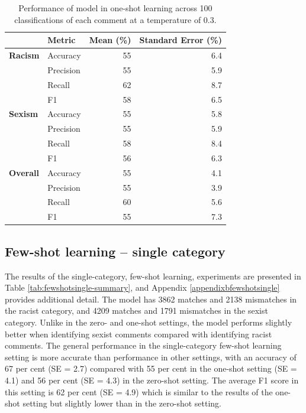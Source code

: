 \documentclass[12pt,]{article}
\begin{document}
\begin{table}

\caption{\label{tab:oneshot-summary}Performance of model in one-shot learning across 100 classifications of each comment at a temperature of 0.3.}
\centering
\begin{tabular}[t]{>{}llrr}
\toprule
 & Metric & Mean (\%) & Standard Error (\%)\\
\midrule
\textbf{Racism} & Accuracy & 55 & 6.4\\
\textbf{} & Precision & 55 & \vphantom{1} 5.9\\
\textbf{} & Recall & 62 & 8.7\\
\textbf{} & F1 & 58 & 6.5\\
\textbf{Sexism} & Accuracy & 55 & 5.8\\
\textbf{} & Precision & 55 & 5.9\\
\textbf{} & Recall & 58 & 8.4\\
\textbf{} & F1 & 56 & 6.3\\
\textbf{Overall} & Accuracy & 55 & 4.1\\
\textbf{} & Precision & 55 & 3.9\\
\textbf{} & Recall & 60 & 5.6\\
\textbf{} & F1 & 55 & 7.3\\
\bottomrule
\end{tabular}
\end{table}

\hypertarget{few-shot-learning-single-category}{%
\subsection{Few-shot learning -- single category}\label{few-shot-learning-single-category}}

The results of the single-category, few-shot learning, experiments are presented in Table \ref{tab:fewshotsingle-summary}, and Appendix \ref{appendixbfewshotsingle} provides additional detail. The model has 3862 matches and 2138 mismatches in the racist category, and 4209 matches and 1791 mismatches in the sexist category. Unlike in the zero- and one-shot settings, the model performs slightly better when identifying sexist comments compared with identifying racist comments. The general performance in the single-category few-shot learning setting is more accurate than performance in other settings, with an accuracy of 67 per cent (SE = 2.7) compared with 55 per cent in the one-shot setting (SE = 4.1) and 56 per cent (SE = 4.3) in the zero-shot setting. The average F1 score in this setting is 62 per cent (SE = 4.9) which is similar to the results of the one-shot setting but slightly lower than in the zero-shot setting.
\end{document}
